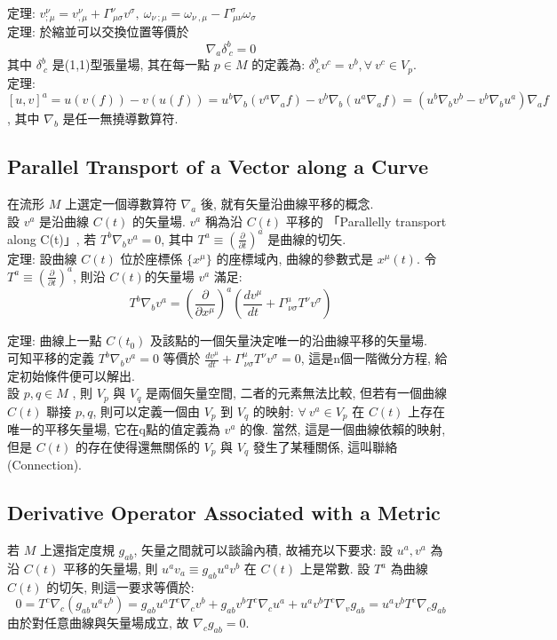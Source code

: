 \documentclass{article}
\begin{document}
\begin{CJK}{UTF8}{bsmi}
定理: $v^\nu_{; \mu}=v^\nu_{, \mu}+\Gamma^\nu_{\ \mu \sigma}v^\sigma,\ \omega_{\nu\ ; \mu}=\omega_{\nu\ , \mu}-\Gamma^\sigma_{\ \mu\nu}\omega_\sigma$
\\

定理: 於縮並可以交換位置等價於 $$\nabla_a \delta^b_{\ c}=0 $$
其中 $\delta^b_{\ c}$ 是(1,1)型張量場, 其在每一點 $p\in M$ 的定義為: $\delta^b_{\ c}v^c=v^b, \forall\ v^c\in V_p$.
\\

定理: $[u,v]^a=u(v(f))-v(u(f))=u^b\nabla_b(v^a\nabla_a f)-v^b\nabla_b(u^a\nabla_a f)=(u^b\nabla_b v^b-v^b\nabla_b u^a)\nabla_a f$, 其中 $\nabla_b$ 是任一無撓導數算符.
\subsection{Parallel Transport of a Vector along a Curve}
在流形 $M$ 上選定一個導數算符 $\nabla_a$ 後, 就有矢量沿曲線平移的概念.
\\ 設 $v^a$ 是沿曲線 $C(t)$ 的矢量場. $v^a$ 稱為沿 $C(t)$ 平移的 「Parallelly transport along C(t)」, 若 $T^b\nabla_b v^a=0$, 其中 $T^a\equiv (\frac{\partial}{\partial t})^a$ 是曲線的切矢.
\\  
 
 定理: 設曲線 $C(t)$ 位於座標係 $\{ x^\mu\}$ 的座標域內, 曲線的參數式是 $x^\mu(t)$. 令 $T^a\equiv (\frac{\partial}{\partial t})^a$, 則沿 $C(t)$的矢量場 $v^a$ 滿足: $$T^b \nabla_b v^a= (\frac{\partial}{\partial x^\mu})^a (\frac{dv^\mu}{dt}+\Gamma^\mu_{\ \nu\sigma}T^\nu v^\sigma) $$


  定理: 曲線上一點 $C(t_0)$ 及該點的一個矢量決定唯一的沿曲線平移的矢量場.
\\  可知平移的定義 $T^b \nabla_b v^a=0$ 等價於 $\frac{dv^\mu}{dt}+\Gamma^\mu_{\ \nu \sigma}T^\nu v^\sigma=0$, 這是n個一階微分方程, 給定初始條件便可以解出.
\\  設 $p,q \in M$ , 則 $V_p$ 與 $V_q$ 是兩個矢量空間, 二者的元素無法比較, 但若有一個曲線 $C(t)$ 聯接 $p,q$, 則可以定義一個由 $V_p$ 到 $V_q$ 的映射: $\forall\ v^a \in V_p$ 在 $C(t)$ 上存在唯一的平移矢量場, 它在q點的值定義為 $v^a$ 的像. 當然, 這是一個曲線依賴的映射, 但是 $C(t)$ 的存在使得還無關係的 $V_p$ 與 $V_q$ 發生了某種關係, 這叫聯絡 (Connection).
\subsection{Derivative Operator Associated with a Metric}
若 $M$ 上還指定度規 $g_{ab}$, 矢量之間就可以談論內積, 故補充以下要求: 設 $u^a,v^a$ 為沿 $C(t)$ 平移的矢量場, 則 $u^a v_a\equiv g_{ab}u^a v^b$ 在 $C(t)$ 上是常數. 設 $T^a$ 為曲線 $C(t)$ 的切矢, 則這一要求等價於: $$0=T^c\nabla_c(g_{ab}u^av^b)=g_{ab}u^aT^c\nabla_c v^b+g_{ab}v^bT^c\nabla_cu^a+u^av^bT^c\nabla_vg_{ab}=u^av^bT^c\nabla_c g_{ab} $$
由於對任意曲線與矢量場成立, 故 $\nabla_cg_{ab}=0$.
\\ 


\end{CJK}
\end{document}
